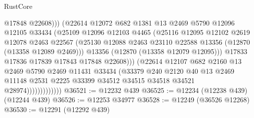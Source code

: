 \begin{lexlean}{RustCore}
\begin{coremodule}
                                  @17848
                                  @22608)))
                            (@22614
                              @12072
                              @682
                              @1381
                              @13
                              @2469
                              @5790
                              @12096
                              @12105
                              @33434
                              (@25109
                                @12096
                                @12103
                                @4465
                                (@25116
                                  @12095
                                  @12102
                                  @2619
                                  @12078
                                  @2463
                                  @22567
                                  (@25130
                                    @12088
                                    @2463
                                    @23110
                                    @22588
                                    @13356
                                    (@12870 (@13358 @12089 @2469)))
                                  @13356
                                  (@12870 (@13358 @12079 @12095)))
                                @17833
                                @17836
                                @17839
                                @17843
                                @17848
                                @22608)))
                          (@22614
                            @12107
                            @682
                            @2160
                            @13
                            @2469
                            @5790
                            @2469
                            @11431
                            @33434
                            (@33379
                              @240
                              @2120
                              @40
                              @13
                              @2469
                              @11148
                              @2531
                              @2225
                              @33399
                              @34512
                              @34515
                              @34518
                              @34521
                              @28974)))))))))))))
@36521 := @12232 @439
@36525 := @12234 (@12238 @439) (@12244 @439)
@36526 := @12253 @34977
@36528 := @12249 (@36526 @12268)
@36530 := @12291 (@12292 @439)

\end{coremodule}
\end{lexlean}
